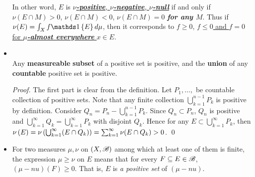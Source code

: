 \documentclass[11pt]{article}
\begin{document}
\begin{itemize}
\begin{definition}
In other word, $E$ is \underline{\emph{\textbf{$\nu$-positive}, \textbf{$\nu$-negative}, \textbf{$\nu$-null}}}  if and only if $\nu(E\cap M)>0$, $\nu(E\cap M)<0$, $\nu(E\cap M)=0$ \emph{\textbf{for any $M$}}. Thus if  $\nu(E) = \int_{X}f\ind{E} d\mu $, then it corresponds to \underline{$f\ge 0$}, \underline{$f\le 0$ and $f=0$ for \emph{\textbf{$\mu$-almost everywhere}} $x\in E$}.
\end{definition}

\item \begin{lemma}\citep{folland2013real}\\
Any \textbf{measureable} \textbf{subset} of a positive set is positive, and the \textbf{union} of any \textbf{countable} positive set is positive. 
\end{lemma}
\begin{proof}
The first part is clear from the definition. Let $P_{1},\ldots, $ be countable collection of positive sets. Note that any finite collection $\bigcup_{k=1}^{n-1}P_{k}$ is positive by definition. Consider $Q_{n}= P_{n}-\bigcup_{k=1}^{n-1}P_{k}$. Since $Q_{n}\subset P_{n}$, $Q_{n}$ is positive and $\bigcup_{k=1}^{\infty}Q_{k}= \bigcup_{k=1}^{\infty}P_{k}$ with disjoint $Q_{k}$. Hence for any $E\subset \bigcup_{k=1}^{\infty}P_{k}$, then $\nu\left(E\right)=
\nu\left(\bigcup_{k=1}^{\infty}(E\cap Q_{k})\right)= \sum_{k=1}^{\infty}\nu(E\cap Q_{k})>0$. \qed
\end{proof}

\item \begin{remark}
For two measures $\mu, \nu$  on $(X,{\mathscr B})$ among which at least one of them is finite, the expression $\mu \ge \nu$ on $E$ means that for every $F \subseteq E \in {\mathscr B}$,  $(\mu-nu)(F) \ge 0$. That is, $E$ is \emph{a positive set} of $(\mu-nu)$.
\end{remark}
\end{itemize}
\end{document}
